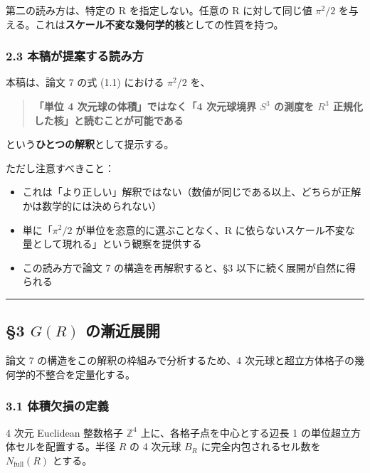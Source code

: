 \documentclass[
]{article}
\providecommand{\tightlist}{%
  \setlength{\itemsep}{0pt}\setlength{\parskip}{0pt}}
\begin{document}
第二の読み方は、特定の R を指定しない。任意の R に対して同じ値
\(\pi^2/2\)
を与える。これは\textbf{スケール不変な幾何学的核}としての性質を持つ。

\subsubsection{2.3
本稿が提案する読み方}\label{ux672cux7a3fux304cux63d0ux6848ux3059ux308bux8aadux307fux65b9}

本稿は、論文 7 の式 (1.1) における \(\pi^2/2\) を、

\begin{quote}
\textbf{「単位 4 次元球の体積」ではなく「4 次元球境界 \(S^3\) の測度を
\(R^3\) 正規化した核」と読むことが可能である}
\end{quote}

という\textbf{ひとつの解釈}として提示する。

ただし注意すべきこと：

\begin{itemize}
\tightlist
\item
  これは「より正しい」解釈ではない（数値が同じである以上、どちらが正解かは数学的には決められない）
\item
  単に「\(\pi^2/2\) が単位を恣意的に選ぶことなく、R
  に依らないスケール不変な量として現れる」という観察を提供する
\item
  この読み方で論文 7 の構造を再解釈すると、§3
  以下に続く展開が自然に得られる
\end{itemize}

\begin{center}\rule{0.5\linewidth}{0.5pt}\end{center}

\subsection{\texorpdfstring{§3 \(G(R)\)
の漸近展開}{§3 G(R) の漸近展開}}\label{gr-ux306eux6f38ux8fd1ux5c55ux958b}

論文 7 の構造をこの解釈の枠組みで分析するため、4
次元球と超立方体格子の幾何学的不整合を定量化する。

\subsubsection{3.1
体積欠損の定義}\label{ux4f53ux7a4dux6b20ux640dux306eux5b9aux7fa9}

4 次元 Euclidean 整数格子 \(\mathbb{Z}^4\)
上に、各格子点を中心とする辺長 1 の単位超立方体セルを配置する。半径
\(R\) の 4 次元球 \(B_R\) に完全内包されるセル数を
\(N_{\text{full}}(R)\) とする。
\end{document}
